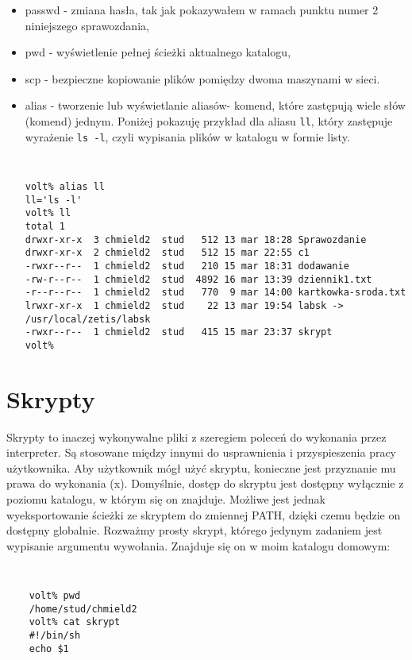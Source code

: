 \documentclass[a4paper,11pt]{article}
\begin{document}
\begin{itemize}
\item passwd - zmiana hasła, tak jak pokazywałem w ramach punktu numer 2 niniejszego sprawozdania,

\item pwd - wyświetlenie pełnej ścieżki aktualnego katalogu,

\item scp - bezpieczne kopiowanie plików pomiędzy dwoma maszynami w sieci.

\item alias - tworzenie lub wyświetlanie aliasów- komend, które zastępują wiele słów (komend) jednym. Poniżej pokazuję przykład dla aliasu {\tt ll}, który zastępuje wyrażenie {\tt ls -l}, czyli wypisania plików w katalogu w formie listy.

{\tt
\begin{verbatim}
volt% alias ll
ll='ls -l'
volt% ll
total 1
drwxr-xr-x  3 chmield2  stud   512 13 mar 18:28 Sprawozdanie
drwxr-xr-x  2 chmield2  stud   512 15 mar 22:55 c1
-rwxr--r--  1 chmield2  stud   210 15 mar 18:31 dodawanie
-rw-r--r--  1 chmield2  stud  4892 16 mar 13:39 dziennik1.txt
-r--r--r--  1 chmield2  stud   770  9 mar 14:00 kartkowka-sroda.txt
lrwxr-xr-x  1 chmield2  stud    22 13 mar 19:54 labsk -> /usr/local/zetis/labsk
-rwxr--r--  1 chmield2  stud   415 15 mar 23:37 skrypt
volt%
\end{verbatim}
}


\end{itemize}

\section{Skrypty}

Skrypty to inaczej wykonywalne pliki z szeregiem poleceń do wykonania przez interpreter. Są stosowane między innymi do usprawnienia i przyspieszenia pracy użytkownika. Aby użytkownik mógł użyć skryptu, konieczne jest przyznanie mu prawa do wykonania (x). 
Domyślnie, dostęp do skryptu jest dostępny wyłącznie z poziomu katalogu, w którym się on znajduje. Możliwe jest jednak wyeksportowanie ścieżki ze skryptem do zmiennej PATH, dzięki czemu będzie on dostępny globalnie. 
Rozważmy prosty skrypt, którego jedynym zadaniem jest wypisanie argumentu wywołania. Znajduje się on w moim katalogu domowym:

{\tt
\begin{verbatim}
    volt% pwd
    /home/stud/chmield2
    volt% cat skrypt
    #!/bin/sh
    echo $1
\end{verbatim}
}
\end{document}
